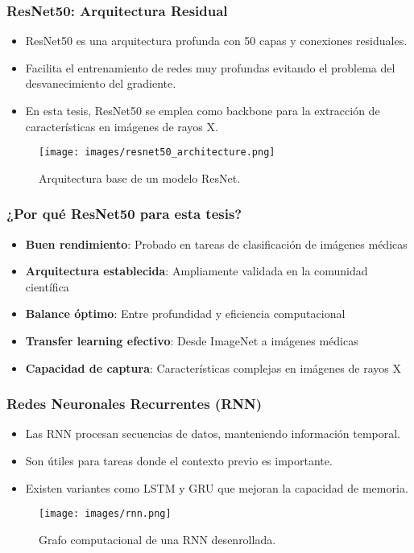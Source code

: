 \begin{frame}
\frametitle{ResNet50: Arquitectura Residual}
\begin{itemize}
    \item ResNet50 es una arquitectura profunda con 50 capas y conexiones residuales.
    \item Facilita el entrenamiento de redes muy profundas evitando el problema del desvanecimiento del gradiente.
    \item En esta tesis, ResNet50 se emplea como backbone para la extracción de características en imágenes de rayos X.
\end{itemize}
\begin{figure}[ht!]
    \centering
    \texttt{[image: images/resnet50\_architecture.png]}
    \caption{Arquitectura base de un modelo ResNet.}
\end{figure}
\end{frame}

\begin{frame}
\frametitle{¿Por qué ResNet50 para esta tesis?}
\begin{itemize}
    \item \textbf{Buen rendimiento}: Probado en tareas de clasificación de imágenes médicas
    \item \textbf{Arquitectura establecida}: Ampliamente validada en la comunidad científica
    \item \textbf{Balance óptimo}: Entre profundidad y eficiencia computacional
    \item \textbf{Transfer learning efectivo}: Desde ImageNet a imágenes médicas
    \item \textbf{Capacidad de captura}: Características complejas en imágenes de rayos X
\end{itemize}
\end{frame}

\begin{frame}
\frametitle{Redes Neuronales Recurrentes (RNN)}
\begin{itemize}
    \item Las RNN procesan secuencias de datos, manteniendo información temporal.
    \item Son útiles para tareas donde el contexto previo es importante.
    \item Existen variantes como LSTM y GRU que mejoran la capacidad de memoria.
\end{itemize}
\begin{figure}[ht!]
    \centering
    \texttt{[image: images/rnn.png]}
    \caption{Grafo computacional de una RNN desenrollada.}
\end{figure}
\end{frame}

